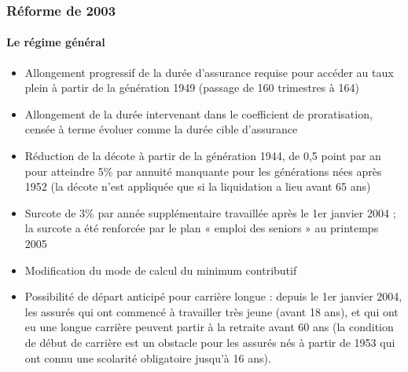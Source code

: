 \subsubsection{Réforme de 2003}

\paragraph{Le régime général}

\begin{itemize}
   \item	Allongement progressif de la durée d'assurance requise pour accéder au taux plein à partir de la génération 1949 (passage de 160 
         trimestres à 164)
   \item	Allongement de la durée intervenant dans le coefficient de proratisation, censée à terme évoluer comme la durée cible d'assurance
   \item	Réduction de la décote à partir de la génération 1944, de 0,5 point par an pour atteindre 5\% par annuité manquante pour les 
         générations nées après 1952 (la décote n'est appliquée que si la liquidation a lieu avant 65 ans)
   \item	Surcote de 3\% par année supplémentaire travaillée après le 1er janvier 2004 ; la surcote a été renforcée par le plan « emploi des 
seniors » au printemps 2005
   \item	Modification du mode de calcul du minimum contributif
   \item	Possibilité de départ anticipé pour carrière longue : depuis le 1er janvier 2004, les assurés qui ont commencé à travailler très 
         jeune (avant 18 ans), et qui ont eu une longue carrière  peuvent partir à la retraite avant 60 ans (la condition de début de carrière est 
         un obstacle pour les assurés nés à partir de 1953 qui ont connu une scolarité obligatoire jusqu'à 16 ans).
\end{itemize}

